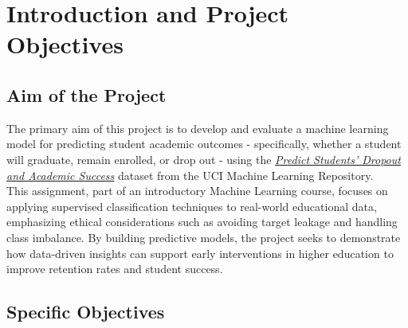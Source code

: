 \documentclass[twoside,final]{hcmut-report}
\begin{document}
\fancyfoot{}
\coverpage\clearpage

\tableofcontents\clearpage
\listoffigures\clearpage

\setcounter{page}{1}

\section{Introduction and Project Objectives}

\subsection*{Aim of the Project}

The primary aim of this project is to develop and evaluate a machine learning model for predicting student academic outcomes - specifically, whether a student will graduate, remain enrolled, or drop out - using the \href{https://archive.ics.uci.edu/dataset/697/predict+students+dropout+and+academic+success}{\textit{Predict Students' Dropout and Academic Success}} dataset from the UCI Machine Learning Repository.\\

This assignment, part of an introductory Machine Learning course, focuses on applying supervised classification techniques to real-world educational data, emphasizing ethical considerations such as avoiding target leakage and handling class imbalance. By building predictive models, the project seeks to demonstrate how data-driven insights can support early interventions in higher education to improve retention rates and student success.

\subsection*{Specific Objectives}
\end{document}
